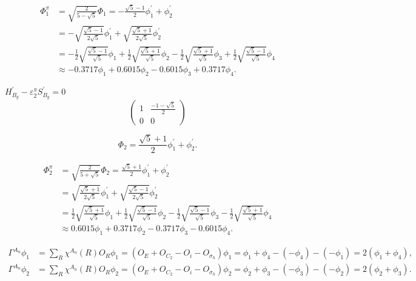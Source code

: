 \documentclass[a4paper]{book}
\newcommand{\Hp}{H^\prime}
\newcommand{\Sp}{S^\prime}
\begin{document}
\begin{solution}
\begin{enumerate}[label=(\alph*)]
		\begin{align}
			\Phi^\pi_1 &= \sqrt{ \frac{2}{5-\sqrt{5}} } \Phi_1 = -\frac{\sqrt{5}-1}{2}\phi^\prime_1 + \phi^\prime_2 \\
			&= - \sqrt{\frac{\sqrt{5}-1}{2\sqrt{5}}} \phi^\prime_1 + \sqrt{\frac{\sqrt{5}+1}{2\sqrt{5}}} \phi^\prime_2	\\
			&= - \frac{1}{2}\sqrt{\frac{\sqrt{5}-1}{\sqrt{5}}}\phi_1  + \frac{1}{2}\sqrt{\frac{\sqrt{5}+1}{\sqrt{5}}} \phi_2 - \frac{1}{2}\sqrt{\frac{\sqrt{5}+1}{\sqrt{5}}} \phi_3 + \frac{1}{2}\sqrt{\frac{\sqrt{5}-1}{\sqrt{5}}} \phi_4 \\
			&\approx -0.3717 \phi_1 + 0.6015 \phi_2 - 0.6015 \phi_3 + 0.3717 \phi_4.
		\end{align}
		
		$\Hp_{B_g}-\varepsilon^\pi_2 \Sp_{B_g} = 0$
		\begin{equation*}
			\begin{pmatrix}
				1	& \frac{-1-\sqrt{5}}{2}	\\	0	&	0
			\end{pmatrix}
		\end{equation*}		
		
		\begin{equation*}
			\Phi_2 = \frac{\sqrt{5}+1}{2}\phi^\prime_1 + \phi^\prime_2.
		\end{equation*}
		
		
		\begin{align}
			\Phi^\pi_2 &= \sqrt{ \frac{2}{5+\sqrt{5}} } \Phi_2 = \frac{\sqrt{5}+1}{2}\phi^\prime_1 + \phi^\prime_2 \\
			&= \sqrt{\frac{\sqrt{5}+1}{2\sqrt{5}}} \phi^\prime_1 + \sqrt{\frac{\sqrt{5}-1}{2\sqrt{5}}} \phi^\prime_2	\\
			&= \frac{1}{2}\sqrt{\frac{\sqrt{5}+1}{\sqrt{5}}}\phi_1  + \frac{1}{2}\sqrt{\frac{\sqrt{5}-1}{\sqrt{5}}} \phi_2 - \frac{1}{2}\sqrt{\frac{\sqrt{5}-1}{\sqrt{5}}} \phi_3 - \frac{1}{2}\sqrt{\frac{\sqrt{5}+1}{\sqrt{5}}} \phi_4 \\
			&\approx 0.6015\phi_1 + 0.3717 \phi_2 - 0.3717 \phi_3 -  0.6015\phi_4.
		\end{align}
		
		\begin{align*}
		\Gamma^{A_u}\phi_1 &= \sum_{R} \chi^{A_u}(R) O_R \phi_1 = (O_E + O_{C_2} - O_{i} - O_{\sigma_h})\phi_1 = \phi_1 + \phi_4 - (-\phi_4) - (-\phi_1) = 2(\phi_1+\phi_4) , \\
		\Gamma^{A_u}\phi_2 &= \sum_{R} \chi^{A_u}(R) O_R \phi_2 = (O_E + O_{C_2} - O_{i} - O_{\sigma_h})\phi_2 = \phi_2 + \phi_3 - (-\phi_3) - (-\phi_2) = 2(\phi_2+\phi_3) .
		\end{align*}
		

\end{enumerate}
\end{solution}
\end{document}
